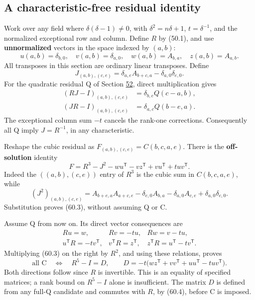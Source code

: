 \documentclass[11pt,reqno]{amsart}
\theoremstyle{plain}
\begin{document}
\subsection{A characteristic-free residual identity}\label{sec:60.1}

Work over any field where \(\delta(\delta-1)\ne0\), with
\(\delta^2=n\delta+1\), \(t=\delta^{-1}\), and the normalized
exceptional row and column. Define \(R\) by (50.1), and use
\textbf{unnormalized} vectors in the space indexed by \((a,b)\):
\[
 u(a,b)=\delta_{b,0},\quad v(a,b)=\delta_{a,0},\quad
 w(a,b)=A_{b,a},\quad z(a,b)=A_{a,b}.
\]
All transposes in this section are ordinary linear transposes. Define
\begin{equation*}
 J_{(a,b),(c,e)}=\delta_{a,e}A_{b+c,a}
                      -\delta_{a,0}\delta_{e,0}.
 \tag{60.1}
\end{equation*}
For the quadratic residual Q of Section \hyperref[sec:52]{52}, direct multiplication gives
\begin{equation*}
 \begin{aligned}
 (RJ-I)_{(a,b),(c,e)}&=\delta_{b,e}Q(c-a,b),\\
 (JR-I)_{(a,b),(c,e)}&=\delta_{a,c}Q(b-e,a).
 \end{aligned}
 \tag{60.2}
\end{equation*}
The exceptional column sum \(-t\) cancels the rank-one corrections.
Consequently all Q imply \(J=R^{-1}\), in any characteristic.

Reshape the cubic residual as
\(F_{(a,b),(c,e)}=C(b,c,a,e)\). There is the \textbf{off-solution} identity
\begin{equation*}
 \boxed{F=R^3-J^2-wu^{\mathsf T}-vz^{\mathsf T}
                         +vu^{\mathsf T}+tuv^{\mathsf T}.}
 \tag{60.3}
\end{equation*}
Indeed the \(((a,b),(c,e))\) entry of \(R^3\) is the cubic sum
in \(C(b,c,a,e)\), while
\[
 (J^2)_{(a,b),(c,e)}
 =A_{b+e,a}A_{a+c,e}-\delta_{e,0}A_{b,a}
 -\delta_{a,0}A_{c,e}+\delta_{a,0}\delta_{e,0}.
\]
Substitution proves (60.3), without assuming Q or C.

Assume Q from now on. Its direct vector consequences are
\begin{equation*}
 \begin{array}{lll}
 Ru=w,&Rv=-tu,&Rw=v-tu,\\
 u^{\mathsf T}R=-tv^{\mathsf T},&
 v^{\mathsf T}R=z^{\mathsf T},&
 z^{\mathsf T}R=u^{\mathsf T}-tv^{\mathsf T}.
 \end{array}
 \tag{60.4}
\end{equation*}
Multiplying (60.3) on the right by \(R^2\), and using these
relations, proves
\begin{equation*}
 \boxed{\text{all C}\quad\Longleftrightarrow\quad R^5-I=D,\qquad
 D=-t\bigl(wz^{\mathsf T}+vv^{\mathsf T}+uu^{\mathsf T}
                                      -tuv^{\mathsf T}\bigr).}
 \tag{60.5}
\end{equation*}
Both directions follow since \(R\) is invertible. This is an equality
of specified matrices; a rank bound on \(R^5-I\) alone is insufficient.
The matrix \(D\) is defined from any full-Q candidate and commutes
with \(R\), by (60.4), before C is imposed.
\end{document}

